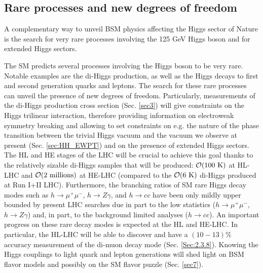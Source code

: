 \subsection{Rare processes and new degrees of freedom}\label{sec:BSMintro}
A complementary way to unveil BSM physics affecting the Higgs sector of Nature is the search for very rare processes involving the 125 GeV Higgs boson and for extended Higgs sectors. 

The SM predicts several processes involving the Higgs boson to be very rare. Notable examples are the di-Higgs production, as well as the Higgs decays to first and second generation quarks and leptons. The search for these rare processes can unveil the presence of new degrees of freedom. Particularly, measurements of the di-Higgs production cross section (Sec. \ref{sec3}) will give constraints on the Higgs trilinear interaction, therefore providing information on electroweak symmetry breaking and allowing to set constraints on e.g. the nature of the phase transition between the trivial Higgs vacuum and the vacuum we observe at present (Sec. \ref{sec:HH_EWPT}) and on the presence of extended Higgs sectors. The HL and HE stages of the LHC will be crucial to achieve this goal thanks to the relatively sizable di-Higgs samples that will be produced: $\mathcal O(100~{\rm{K}})$ at HL-LHC and $\mathcal O(2~{\rm{millions}})$ at HE-LHC (compared to the $\mathcal O(6~{\rm{K}})$ di-Higgs produced at Run I+II LHC). Furthermore, the branching ratios of SM rare Higgs decay modes such as $h\to\mu^+\mu^-$, $h\to Z\gamma$, and $h\to cc$ have been only mildly upper bounded by present LHC searches due in part to the low statistics ($h\to\mu^+\mu^-$, $h\to Z\gamma$) and, in part, to the background limited analyses ($h\to cc$). An important progress on these rare decay modes is expected at the HL and HE-LHC. In particular, the HL-LHC will be able to discover and have a $(10-13)\%$ accuracy measurement of the di-muon decay mode (Sec. \ref{Sec:2.3.8}). Knowing the Higgs couplings to light quark and lepton generations will shed light on BSM flavor models and possibly on the SM flavor puzzle (Sec. \ref{sec7}).

